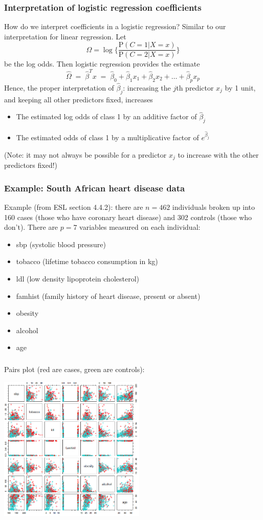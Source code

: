 \documentclass[mathserif]{beamer}
\def\P{\mathrm{P}}
\def\hbeta{\hat{\beta}}
\def\red{\color[rgb]{0.8,0,0}}
\begin{document}
\begin{frame}
\frametitle{Interpretation of logistic regression coefficients}
\smallskip
How do we interpret coefficients in a logistic regression? Similar
to our interpretation for linear regression. Let 
$$\Omega = \log\Big\{\frac{\P(C=1|X=x)}{\P(C=2|X=x)}\Big\}$$ be the log odds. 
Then logistic regression provides the estimate
$$\hat{\Omega} \;=\; \hbeta^T x \;=\; 
\hbeta_0+\hbeta_1x_1 + \hbeta_2 x_2 + \ldots +\hbeta_p x_p$$
Hence, the proper {\red interpretation} of $\hbeta_j$: increasing the $j$th 
predictor $x_j$ by 1 unit, and keeping all other predictors fixed, increases
\begin{itemize} 
\item The estimated log odds of class 1 by an additive factor of $\hbeta_j$
\item The estimated odds of class 1 by a multiplicative factor of $e^{\hbeta_j}$
\end{itemize}
\smallskip
\smallskip
(Note: it may not always be possible for a 
predictor $x_j$ to increase with the other predictors fixed!)
\end{frame}

\begin{frame}
\frametitle{Example: South African heart disease data}
Example (from ESL section 4.4.2): there are $n=462$ individuals broken up
into 160 {\red cases} (those who have coronary heart disease) and 
302 {\red controls} (those who don't). There are $p=7$ variables measured on
each individual:

\bigskip
\begin{itemize}
\item sbp (systolic blood pressure) 
\item tobacco (lifetime tobacco consumption in kg) 
\item ldl (low density lipoprotein cholesterol) 
\item famhist (family history of heart disease, present or absent) 
\item obesity 
\item alcohol 
\item age 
\end{itemize}
\end{frame}

\begin{frame}
\frametitle{}
\bigskip
Pairs plot (red are cases, green are controls):
\begin{center}
\includegraphics[width=2.75in]{sapairs.png}
\end{center}
\end{frame}
\end{document}
